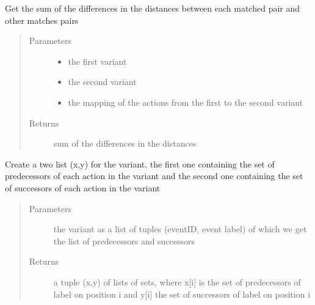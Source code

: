 \documentclass[letterpaper,10pt,english]{sphinxmanual}
\begin{document}
\begin{fulllineitems}
\label{\detokenize{cost function:costFunction.cost.costStructure}}
Get the sum of the differences in the distances between each matched pair and other matches pairs
\begin{quote}\begin{description}
\item[{Parameters}] \leavevmode\begin{itemize}
\item {} 
 \textendash{} the first variant

\item {} 
 \textendash{} the second variant

\item {} 
 \textendash{} the mapping of the actions from the first to the second variant

\end{itemize}

\item[{Returns}] \leavevmode
sum of the differences in the distances

\end{description}\end{quote}

\end{fulllineitems}


\begin{fulllineitems}
\label{\detokenize{cost function:costFunction.cost.context}}
Create a two list (x,y) for the variant, the first one containing the set of predecessors of each action in the variant and the second one containing the set of successors of each action in the variant
\begin{quote}\begin{description}
\item[{Parameters}] \leavevmode
{} \textendash{} the variant as a list of tuples (eventID, event label) of which we get the list of predecessors and successors

\item[{Returns}] \leavevmode
a tuple (x,y) of lists of sets, where x{[}i{]} is the set of predecessors of label on position i and y{[}i{]} the set of successors of label on position i

\end{description}\end{quote}

\end{fulllineitems}
\end{document}
